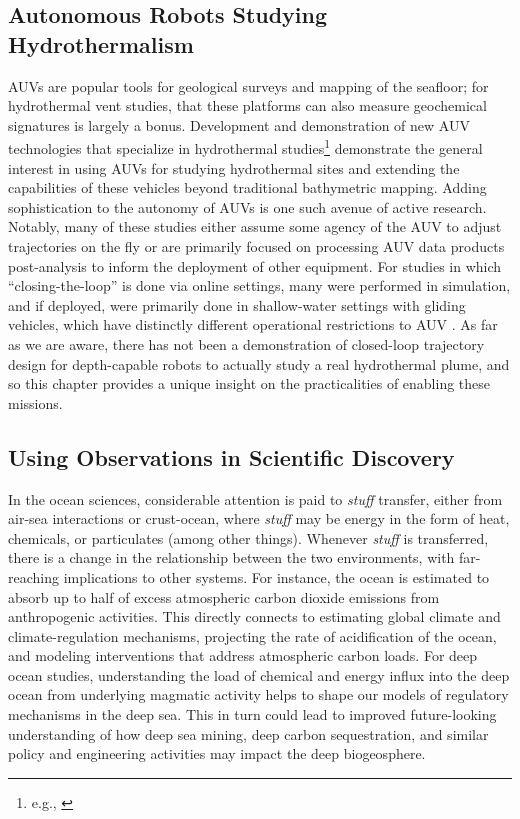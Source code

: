 \subsection{Autonomous Robots Studying Hydrothermalism}
AUVs are popular tools for geological surveys and mapping of the seafloor; for hydrothermal vent studies, that these platforms can also measure geochemical signatures is largely a bonus\autocite{clague2008abundance,kumagai2010hydrothermal,kinsey2011assessing,ryan2011high,caratori2012crustal,baker2019posteruption,mcphail2010challenges,schmid2019physico}. Development and demonstration of new AUV technologies that specialize in hydrothermal studies\footnote{e.g., \autocite{maki2014auv,okamoto2019visual}} demonstrate the general interest in using AUVs for studying hydrothermal sites and extending the capabilities of these vehicles beyond traditional bathymetric mapping. Adding sophistication to the autonomy of AUVs is one such avenue of active research\autocite{branch2020demonstration,wang20203,mason2020evaluation,saigol2009information}. Notably, many of these studies either assume some agency of the AUV to adjust trajectories on the fly\autocite{branch2020demonstration,wang20203,saigol2009information} or are primarily focused on processing AUV data products post-analysis to inform the deployment of other equipment\autocite{jakuba2008autonomous}. For studies in which ``closing-the-loop'' is done via online settings, many were performed in simulation, and if deployed, were primarily done in shallow-water settings with gliding vehicles, which have distinctly different operational restrictions to AUV \Sentry. As far as we are aware, there has not been a demonstration of closed-loop trajectory design for depth-capable robots to actually study a real hydrothermal plume, and so this chapter provides a unique insight on the practicalities of enabling these missions.

\subsection{Using Observations in Scientific Discovery}
In the ocean sciences, considerable attention is paid to \emph{stuff} transfer, either from air-sea interactions or crust-ocean, where \emph{stuff} may be energy in the form of heat, chemicals, or particulates (among other things). Whenever \emph{stuff} is transferred, there is a change in the relationship between the two environments, with far-reaching implications to other systems. For instance, the ocean is estimated to absorb up to half of excess atmospheric carbon dioxide emissions from anthropogenic activities\autocite{hori2019blue,raven2005ocean}. This directly connects to estimating global climate and climate-regulation mechanisms, projecting the rate of acidification of the ocean, and modeling interventions that address atmospheric carbon loads. For deep ocean studies, understanding the load of chemical and energy influx into the deep ocean from underlying magmatic activity helps to shape our models of regulatory mechanisms in the deep sea. This in turn could lead to improved future-looking understanding of how deep sea mining, deep carbon sequestration, and similar policy and engineering activities may impact the deep biogeosphere.

